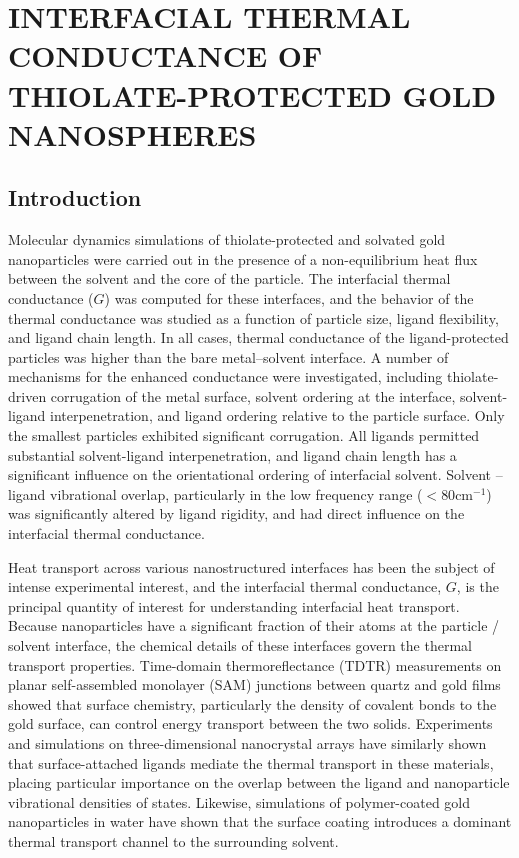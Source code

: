 
\chapter{INTERFACIAL THERMAL CONDUCTANCE OF THIOLATE-PROTECTED GOLD NANOSPHERES}

\section{Introduction}
  Molecular dynamics simulations of thiolate-protected and solvated gold nanoparticles were carried out in the presence of a non-equilibrium heat flux between the solvent and the core of the particle. The interfacial thermal conductance ($G$) was computed for these interfaces, and the behavior of the thermal conductance was studied as a function of particle size, ligand flexibility, and ligand chain length. In all cases, thermal conductance of the ligand-protected particles was higher than the bare metal--solvent interface.  A number of mechanisms for the enhanced conductance were investigated, including thiolate-driven corrugation of the metal surface, solvent ordering at the interface, solvent-ligand interpenetration, and ligand ordering relative to the particle
  surface. Only the smallest particles exhibited significant
  corrugation.  All ligands permitted substantial solvent-ligand
  interpenetration, and ligand chain length has a significant
  influence on the orientational ordering of interfacial solvent.
  Solvent -- ligand vibrational overlap, particularly in the low
  frequency range ($< 80 \mathrm{cm}^{-1}$) was significantly altered
  by ligand rigidity, and had direct influence on the interfacial
  thermal conductance.


Heat transport across various nanostructured interfaces has been the
subject of intense experimental
interest,\cite{Wilson:2002uq,Ge:2004yg,Shenogina:2009ix,Wang10082007,Schmidt:2008ad,Juve:2009pt,Alper:2010pd,Harikrishna:2013ys}
and the interfacial thermal conductance, $G$, is the principal
quantity of interest for understanding interfacial heat
transport.\cite{Cahill:2003fk} Because nanoparticles have a
significant fraction of their atoms at the particle / solvent
interface, the chemical details of these interfaces govern the thermal
transport properties.  Time-domain thermoreflectance (TDTR)
measurements on planar self-assembled monolayer (SAM) junctions
between quartz and gold films showed that surface chemistry,
particularly the density of covalent bonds to the gold surface, can
control energy transport between the two solids.\cite{Losego:2012fr}
Experiments and simulations on three-dimensional nanocrystal arrays
have similarly shown that surface-attached ligands mediate the thermal
transport in these materials, placing particular importance on the
overlap between the ligand and nanoparticle vibrational densities of
states.\cite{Ong:2013rt,Ong:2014yq} Likewise, simulations of
polymer-coated gold nanoparticles in water have shown that the surface
coating introduces a dominant thermal transport channel to the
surrounding solvent.\cite{Soussi:2015fj}

